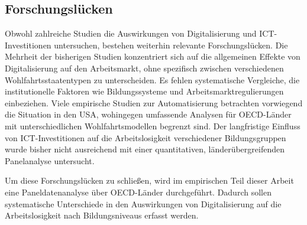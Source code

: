 
\subsection{Forschungslücken}

Obwohl zahlreiche Studien die Auswirkungen von Digitalisierung und \ac{ICT}-Investitionen 
untersuchen, bestehen weiterhin relevante Forschungslücken. Die Mehrheit der bisherigen 
Studien konzentriert sich auf die allgemeinen Effekte von Digitalisierung auf den 
Arbeitsmarkt, ohne spezifisch zwischen verschiedenen Wohlfahrtsstaatentypen zu 
unterscheiden. Es fehlen systematische Vergleiche, die institutionelle Faktoren wie 
Bildungssysteme und Arbeitsmarktregulierungen einbeziehen. Viele empirische Studien zur 
Automatisierung betrachten vorwiegend die Situation in den USA, wohingegen umfassende 
Analysen für \ac{OECD}-Länder mit unterschiedlichen Wohlfahrtsmodellen begrenzt sind. Der 
langfristige Einfluss von \ac{ICT}-Investitionen auf die Arbeitslosigkeit verschiedener 
Bildungsgruppen wurde bisher nicht ausreichend mit einer quantitativen, 
länderübergreifenden Panelanalyse untersucht.

Um diese Forschungslücken zu schließen, wird im empirischen Teil dieser Arbeit eine 
Paneldatenanalyse über \ac{OECD}-Länder durchgeführt. Dadurch sollen systematische 
Unterschiede in den Auswirkungen von Digitalisierung auf die Arbeitslosigkeit nach 
Bildungsniveaus erfasst werden.
